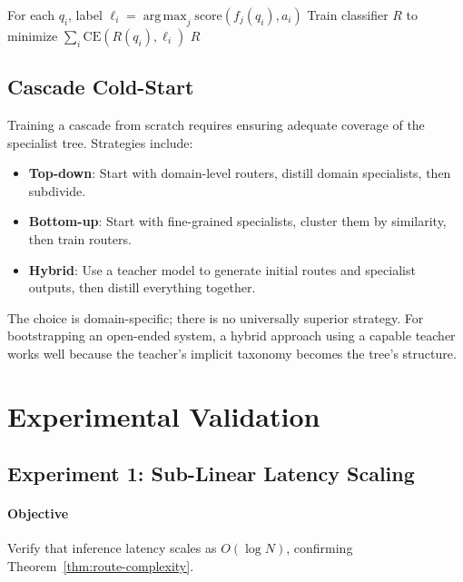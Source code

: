 \documentclass[11pt,a4paper]{article}
\theoremstyle{definition}
\theoremstyle{remark}
\DeclareMathOperator*{\argmax}{arg\,max}
\begin{document}
\begin{algorithm}
\caption{Router Training}
\label{alg:train-router}
\begin{algorithmic}[1]
    \State For each $q_i$, label $\ell_i = \argmax_j \mathrm{score}(f_j(q_i), a_i)$
    \State Train classifier $R$ to minimize $\sum_i \mathrm{CE}(R(q_i), \ell_i)$
    \State \Return $R$
\EndFunction
\end{algorithmic}
\end{algorithm}

\subsection{Cascade Cold-Start}

Training a cascade from scratch requires ensuring adequate coverage of the specialist tree. Strategies include:
\begin{itemize}
    \item \textbf{Top-down}: Start with domain-level routers, distill domain specialists, then subdivide.
    \item \textbf{Bottom-up}: Start with fine-grained specialists, cluster them by similarity, then train routers.
    \item \textbf{Hybrid}: Use a teacher model to generate initial routes and specialist outputs, then distill everything together.
\end{itemize}

The choice is domain-specific; there is no universally superior strategy. For bootstrapping an open-ended system, a hybrid approach using a capable teacher works well because the teacher's implicit taxonomy becomes the tree's structure.

\section{Experimental Validation}
\label{sec:validation}

\subsection{Experiment 1: Sub-Linear Latency Scaling}

\paragraph{Objective} Verify that inference latency scales as $O(\log N)$, confirming Theorem~\ref{thm:route-complexity}.
\end{document}
